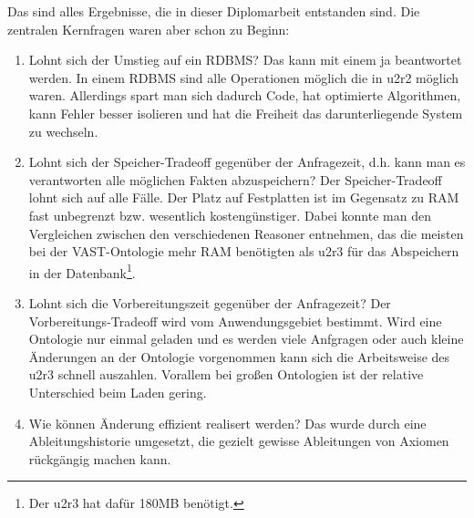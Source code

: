 Das sind alles Ergebnisse, die in dieser Diplomarbeit entstanden sind. Die zentralen Kernfragen waren aber schon zu Beginn:
\begin{enumerate}
  \item Lohnt sich der Umstieg auf ein RDBMS? Das kann mit einem ja beantwortet werden. In einem RDBMS sind alle Operationen möglich die in u2r2 möglich waren. Allerdings spart man sich dadurch Code, hat optimierte Algorithmen, kann Fehler besser isolieren und hat die Freiheit das darunterliegende System zu wechseln.
  \item Lohnt sich der Speicher-Tradeoff gegenüber der Anfragezeit, d.h. kann man es verantworten alle möglichen Fakten abzuspeichern? Der Speicher-Tradeoff lohnt sich auf alle Fälle. Der Platz auf Festplatten ist im Gegensatz zu RAM fast unbegrenzt bzw. wesentlich kostengünstiger. Dabei konnte man den Vergleichen zwischen den verschiedenen Reasoner entnehmen, das die meisten bei der VAST-Ontologie mehr RAM benötigten als u2r3 für das Abspeichern in der Datenbank\footnote{Der u2r3 hat dafür 180MB benötigt.}.
  \item Lohnt sich die Vorbereitungszeit gegenüber der Anfragezeit? Der Vorbereitungs-Tradeoff wird vom Anwendungsgebiet bestimmt. Wird eine Ontologie nur einmal geladen und es werden viele Anfgragen oder auch kleine Änderungen an der Ontologie vorgenommen kann sich die Arbeitsweise des u2r3 schnell auszahlen. Vorallem bei großen Ontologien ist der relative Unterschied beim Laden gering.
  \item Wie können Änderung effizient realisert werden? Das wurde durch eine Ableitungshistorie umgesetzt, die gezielt gewisse Ableitungen von Axiomen rückgängig machen kann.
\end{enumerate}
